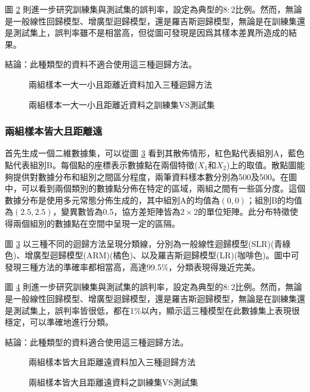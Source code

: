 \documentclass[12pt, a4paper]{article}
\begin{document}
圖 \ref{fig:rdn10-LARline2} 則進一步研究訓練集與測試集的誤判率，設定為典型的$8:2$比例。然而，無論是一般線性回歸模型、增廣型迴歸模型，還是羅吉斯迴歸模型，無論是在訓練集還是測試集上，誤判率雖不是相當高，但從圖可發現是因爲其樣本差異所造成的結果。

結論：此種類型的資料不適合使用這三種迴歸方法。
\begin{figure}[H]
    \caption{兩組樣本一大一小且距離近資料加入三種迴歸方法}
    \label{fig:rdn10-LARline}
\end{figure}
\begin{figure}[H]
    \caption{兩組樣本一大一小且距離近資料之訓練集VS測試集}
    \label{fig:rdn10-LARline2}
\end{figure}

\subsubsection{兩組樣本皆大且距離遠}

首先生成一個二維數據集，可以從圖 \ref{fig:rdn11-LARline} 看到其散佈情形，紅色點代表組別A，藍色點代表組別B。每個點的座標表示數據點在兩個特徵($X_1$和$X_2$)上的取值。散點圖能夠提供對數據分布和組別之間區分程度，兩筆資料樣本數分別為500及500。在圖中，可以看到兩個類別的數據點分佈在特定的區域，兩組之間有一些區分度。這個數據分布是使用多元常態分佈生成的，其中組別A的均值為$(0, 0)$；組別B的均值為$(2.5, 2.5)$，變異數皆為0.5，協方差矩陣皆為$2 \times 2$的單位矩陣。此分布特徵使得兩個組別的數據點在空間中呈現一定的區隔。

圖 \ref{fig:rdn11-LARline} 以三種不同的迴歸方法呈現分類線，分別為一般線性迴歸模型(SLR)(青綠色)、增廣型迴歸模型(ARM)(橘色)、以及羅吉斯迴歸模型(LR)(咖啡色)。圖中可發現三種方法的準確率都相當高，高達99.5\%，分類表現得幾近完美。

圖 \ref{fig:rdn11-LARline2} 則進一步研究訓練集與測試集的誤判率，設定為典型的$8:2$比例。然而，無論是一般線性回歸模型、增廣型迴歸模型，還是羅吉斯迴歸模型，無論是在訓練集還是測試集上，誤判率皆很低，都在1\%以內，顯示這三種模型在此數據集上表現很穩定，可以準確地進行分類。

結論：此種類型的資料適合使用這三種迴歸方法。
\begin{figure}[H]
    \caption{兩組樣本皆大且距離遠資料加入三種迴歸方法}
    \label{fig:rdn11-LARline}
\end{figure}
\begin{figure}[H]
    \caption{兩組樣本皆大且距離遠資料之訓練集VS測試集}
    \label{fig:rdn11-LARline2}
\end{figure}
\end{document}

